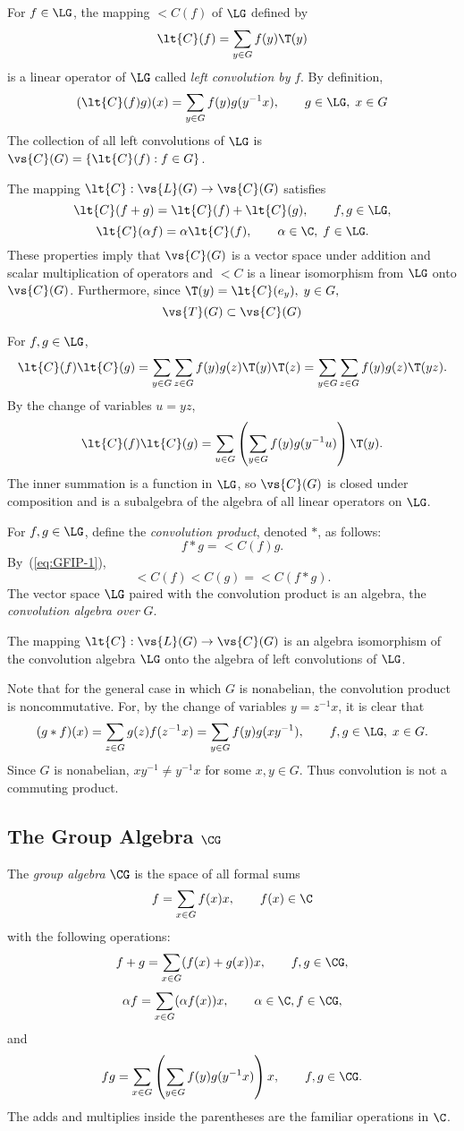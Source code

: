 For $f\in \LG$, the mapping $\lt{C}(f)$ of $\LG$ defined by 
\[
\lt{C}(f) = \sum_{y\in G} f(y) \T(y)
\]
is a linear operator of $\LG$ called \emph{left convolution by} $f$.  By
definition,
\[
(\lt{C}(f)g)(x) = \sum_{y\in G} f(y) g(y^{-1}x), \qquad g \in \LG,\; x\in G
\]
The collection of all left convolutions of $\LG$ is $\vs{C}(G) = \left\{\lt{C}(f) : f \in G \right\}$.

The mapping $\lt{C}: \vs{L}(G) \to \vs{C}(G)$ satisfies 
\[
\lt{C}(f+g) = \lt{C}(f) + \lt{C}(g), \qquad f, g \in \LG,
\]
\[
\lt{C}(\alpha f) = \alpha \lt{C}(f), \qquad \alpha \in \C,\; f \in \LG.
\]
These properties imply that $\vs{C}(G)$ is a vector space under addition and scalar
multiplication of operators and $\lt{C}$ is a linear isomorphism from $\LG$ onto
$\vs{C}(G)$.  Furthermore, since $\T(y) = \lt{C}(e_y),\; y\in G,$
\[
\vs{T}(G) \subset \vs{C}(G)
\]

For $f, g \in \LG$,
\[
\lt{C}(f)\lt{C}(g) = \sum_{y\in G}\sum_{z\in G} f(y)g(z)\T(y)\T(z) = \sum_{y\in
  G}\sum_{z\in G} f(y)g(z)\T(yz).
\]
By the change of variables $u = yz$,
\begin{equation}\label{eq:GFIP-1}
\lt{C}(f)\lt{C}(g) = \sum_{u\in G}\left(\sum_{y\in G} f(y)g(y^{-1}u)\right)\T(y).
\end{equation}
The inner summation is a function in $\LG$, so $\vs{C}(G)$ is closed under
composition and is a subalgebra of the algebra of all linear operators on
$\LG$. 

For $f, g \in \LG$, define the \emph{convolution product}, denoted $*$, as
follows: 
\[
f * g  = \lt{C}(f)g.
\]
By~(\ref{eq:GFIP-1}),
\[
\lt{C}(f)\lt{C}(g) = \lt{C}(f*g).
\]
The vector space $\LG$ paired with the convolution product is an algebra,
the \emph{convolution algebra over} $G$.
\begin{theorem}
The mapping $\lt{C}: \vs{L}(G) \to \vs{C}(G)$ is an algebra isomorphism of the
convolution algebra $\LG$ onto the algebra of left convolutions of $\LG$.
\end{theorem}

Note that for the general case in which $G$ is nonabelian, the convolution
product is noncommutative.  For, by the change of variables $y = z^{-1}x$, it
is clear that
\[
(g * f)(x) = \sum_{z\in G} g(z)f(z^{-1}x) = \sum_{y\in G} f(y) g(xy^{-1}), \qquad f, g \in \LG,\;
x\in G.
\]
Since $G$ is nonabelian, $xy^{-1} \neq y^{-1}x$ for some $x, y
\in G$. Thus convolution is not a commuting product.

\subsection{The Group Algebra $\CG$} 
\label{sec:groupalgebra}
The \emph{group algebra} $\CG$ is the space of all formal sums
\[
f = \sum_{x\in G} f(x) x, \qquad f(x) \in \C
\]
with the following operations:
\[
f+g = \sum_{x\in G} (f(x) + g(x))x, \qquad f, g \in \CG,
\]
\[
\alpha f = \sum_{x\in G} (\alpha f(x)) x, \qquad \alpha \in \C, f \in \CG,
\]
and
\[ %
fg = \sum_{x\in G}\left(\sum_{y\in G} f(y)g(y^{-1}x)\right)x, \qquad f, g \in \CG.
\] %
The adds and multiplies inside the parentheses are the familiar operations in $\C$.

